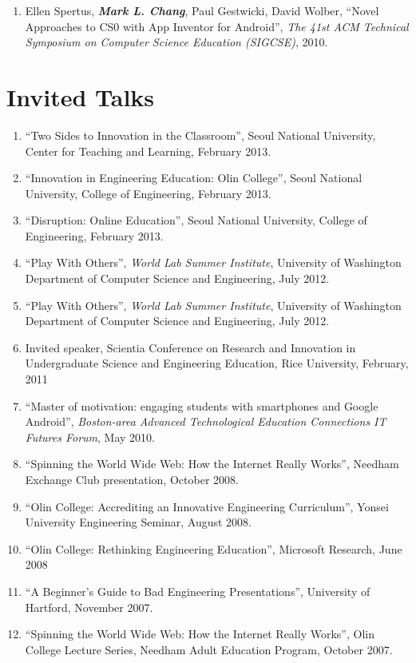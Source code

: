 \documentclass[line]{res}
\begin{document}
\begin{resume}
\begin{enumerate}
		\item Ellen Spertus, \textbf{\textit{Mark L. Chang}}, Paul Gestwicki, David Wolber, ``Novel Approaches to CS0 with App Inventor for Android'', \textit{The 41st ACM Technical Symposium on Computer Science Education (SIGCSE)}, 2010. 
	\end{enumerate}
	
	\section{\sc Invited Talks}
	\begin{enumerate}
		\item ``Two Sides to Innovation in the Classroom'', Seoul National University, Center for Teaching and Learning, February 2013.

		\item ``Innovation in Engineering Education: Olin College'', Seoul National University, College of Engineering, February 2013.

		\item ``Disruption: Online Education'', Seoul National University, College of Engineering, February 2013.
	
		\item ``Play With Others'', \textit{World Lab Summer Institute}, University of Washington Department of Computer Science and Engineering, July 2012.

		\item ``Play With Others'', \textit{World Lab Summer Institute}, University of Washington Department of Computer Science and Engineering, July 2012.
		\item Invited speaker, Scientia Conference on Research and Innovation in Undergraduate Science and Engineering Education, Rice University, February, 2011
		\item ``Master of motivation: engaging students with smartphones and Google Android'', \textit{Boston-area Advanced Technological Education Connections IT Futures Forum}, May 2010. 
		\item ``Spinning the World Wide Web: How the Internet Really Works'', Needham Exchange Club presentation, October 2008. 
		\item ``Olin College: Accrediting an Innovative Engineering Curriculum'', Yonsei University Engineering Seminar, August 2008. 
		\item ``Olin College: Rethinking Engineering Education'', Microsoft Research, June 2008 
		\item ``A Beginner's Guide to Bad Engineering Presentations'', University of Hartford, November 2007. 
		\item ``Spinning the World Wide Web: How the Internet Really Works'', Olin College Lecture Series, Needham Adult Education Program, October 2007. 
	\end{enumerate}
	

\end{resume}
\end{document}
